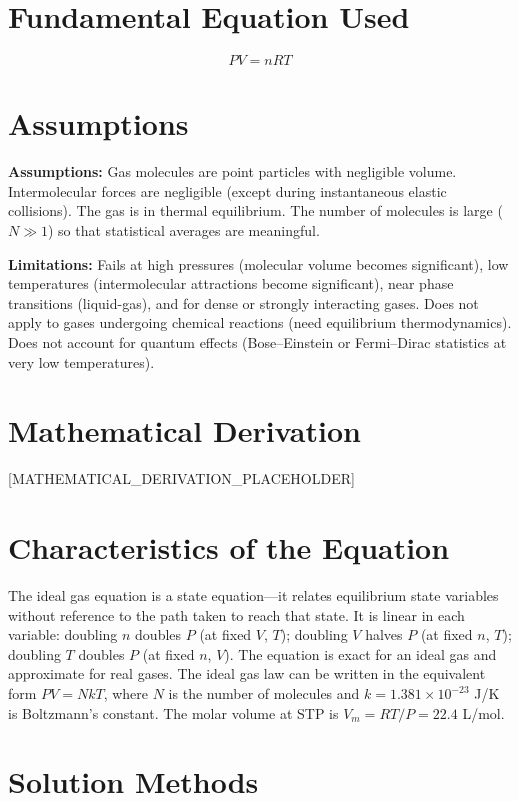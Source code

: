 \documentclass[11pt,openright]{book}
\begin{document}
\section*{Fundamental Equation Used}

\[
PV=nRT
\]
\section*{Assumptions}

\textbf{Assumptions:} Gas molecules are point particles with negligible volume. Intermolecular forces are negligible (except during instantaneous elastic collisions). The gas is in thermal equilibrium. The number of molecules is large ($N \gg 1$) so that statistical averages are meaningful.


\textbf{Limitations:} Fails at high pressures (molecular volume becomes significant), low temperatures (intermolecular attractions become significant), near phase transitions (liquid-gas), and for dense or strongly interacting gases. Does not apply to gases undergoing chemical reactions (need equilibrium thermodynamics). Does not account for quantum effects (Bose--Einstein or Fermi--Dirac statistics at very low temperatures).


\section*{Mathematical Derivation}

[MATHEMATICAL_DERIVATION_PLACEHOLDER]

\section*{Characteristics of the Equation}

The ideal gas equation is a state equation---it relates equilibrium state variables without reference to the path taken to reach that state. It is linear in each variable: doubling $n$ doubles $P$ (at fixed $V$, $T$); doubling $V$ halves $P$ (at fixed $n$, $T$); doubling $T$ doubles $P$ (at fixed $n$, $V$). The equation is exact for an ideal gas and approximate for real gases. The ideal gas law can be written in the equivalent form $PV = NkT$, where $N$ is the number of molecules and $k = 1.381 \times 10^{-23}$ J/K is Boltzmann's constant. The molar volume at STP is $V_m = RT/P = 22.4$ L/mol.
\section*{Solution Methods}
\end{document}
